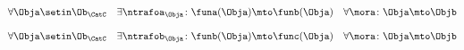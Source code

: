 {\begin{forslides}
    \begin{equation}\label{eq:ex_nt_22}
        \forall \Obja \setin\Ob_\CatC \quad \exists \ntrafoa_{\Obja} \colon \funa(\Obja) \mto \funb(\Obja) \quad  \forall \mora \colon \Obja \mto \Objb
    \end{equation}

    \begin{equation}\label{eq:ex_nt_23}
        \forall \Obja \setin\Ob_\CatC \quad \exists \ntrafob_{\Obja} \colon \funb(\Obja) \mto \func(\Obja) \quad  \forall \mora \colon \Obja \mto \Objb
    \end{equation}




\end{forslides}}
